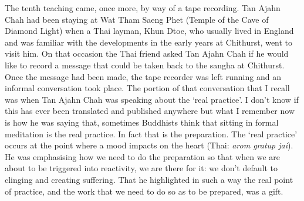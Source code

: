 The tenth teaching came, once more, by way of a tape recording. Tan
Ajahn Chah had been staying at Wat Tham Saeng Phet (Temple of the Cave
of Diamond Light) when a Thai layman, Khun Dtoe, who usually lived in
England and was familiar with the developments in the early years at
Chithurst, went to visit him. On that occasion the Thai friend asked Tan
Ajahn Chah if he would like to record a message that could be taken back
to the sangha at Chithurst. Once the message had been made, the tape
recorder was left running and an informal conversation took place. The
portion of that conversation that I recall was when Tan Ajahn Chah was
speaking about the `real practice'. I don't know if this has ever been
translated and published anywhere but what I remember now is how he was
saying that, sometimes Buddhists think that sitting in formal meditation
is the real practice. In fact that is the preparation. The `real
practice' occurs at the point where a mood impacts on the heart (Thai:
\emph{arom gratup jai}). He was emphasising how we need to do the
preparation so that when we are about to be triggered into reactivity,
we are there for it: we don't default to clinging and creating
suffering. That he highlighted in such a way the real point of practice,
and the work that we need to do so as to be prepared, was a gift.

